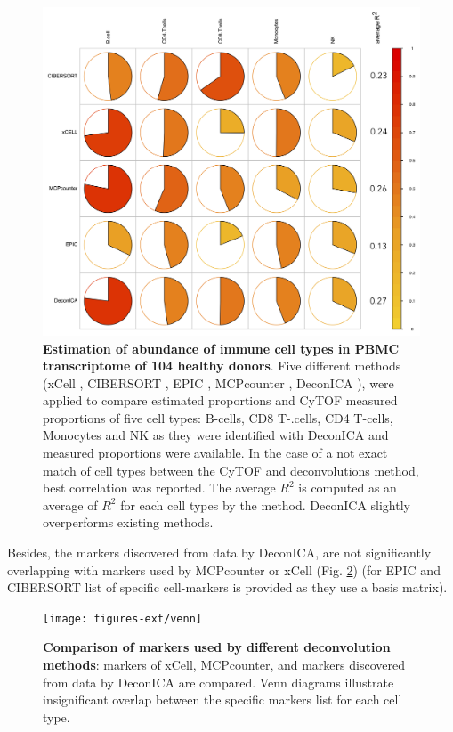 \documentclass[12pt,]{book}
\theoremstyle{definition}
\theoremstyle{definition}
\theoremstyle{definition}
\theoremstyle{remark}
\begin{document}
\begin{figure}

{\centering \includegraphics[width=0.7\linewidth]{figures-ext/comparisonR2} 

}

\caption[Estimation of abundance of immune cell types in PBMC transcriptome of 104 healthy donors]{\textbf{Estimation of abundance of immune cell
types in PBMC transcriptome of 104 healthy donors}. Five different
methods (xCell \citep{Aran2017}, CIBERSORT \citep{Newman2015}, EPIC
\citep{Racle2017}, MCPcounter \citep{Becht2016}, DeconICA
\citep{Czerwinska2018}), were applied to compare estimated proportions
and CyTOF measured proportions of five cell types: B-cells, CD8
T-.cells, CD4 T-cells, Monocytes and NK as they were identified with
DeconICA and measured proportions were available. In the case of a not
exact match of cell types between the CyTOF and deconvolutions method,
best correlation was reported. The average \(R^2\) is computed as an
average of \(R^2\) for each cell types by the method. DeconICA slightly
overperforms existing methods.}\label{fig:comparison}
\end{figure}














Besides, the markers discovered from data by DeconICA, are not
significantly overlapping with markers used by MCPcounter or xCell (Fig.
\ref{fig:venn}) (for EPIC and CIBERSORT list of specific cell-markers is
provided as they use a basis matrix).

\begin{figure}

{\centering \texttt{[image: figures-ext/venn]} 

}

\caption[Comparison of markers used by different deconvolution methods]{\textbf{Comparison of markers used by different
deconvolution methods}: markers of xCell, MCPcounter, and markers
discovered from data by DeconICA are compared. Venn diagrams illustrate
insignificant overlap between the specific markers list for each cell
type.}\label{fig:venn}
\end{figure}
\end{document}
